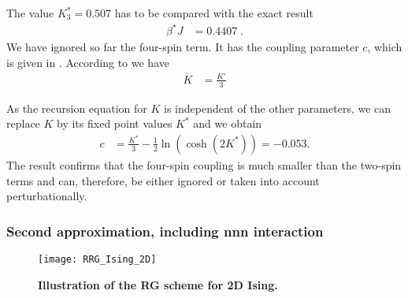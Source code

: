 The value $K^{*}_{3}=0.507$ has to be compared with the exact result
%
\begin{align*}
\beta^{*} J &= 0.4407\;.
\end{align*}
%
We have ignored so far the four-spin term. It has the coupling parameter $c$, which is given in 
. According to  we have
%
\begin{align*}
\overline K &= \frac{K'}{3}
\end{align*}

As the recursion equation for $K$ is independent of the other parameters, 
we can replace $K$ by its  fixed point values $K^{*}$ and we obtain
\begin{align}\label{eq:four:spin:term}
c &=  \frac{K^{*}}{3}  - \frac{1}{2}\ln(\cosh(2 K^{*})) = -0.053.
\end{align}
%
%
The result confirms that the four-spin coupling is much smaller than the two-spin terms
and can, therefore, be either ignored or taken into account perturbationally.





\subsubsection{Second approximation, including nnn interaction}


%
\begin{figure}[htbp]
\begin{center}
\texttt{[image: RRG\_Ising\_2D]}
\caption{\bf Illustration of the RG scheme for 2D Ising. 
}
\label{fig:rng:ising:2d:b
} 
\end{center}
\end{figure}

